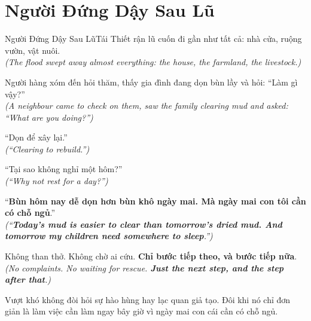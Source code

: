 \section{Người Đứng Dậy Sau Lũ}
\begin{truyen}{Người Đứng Dậy Sau Lũ}{Tái Thiết}
rận lũ cuốn đi gần như tất cả: nhà cửa, ruộng vườn, vật nuôi.\\
\textit{(The flood swept away almost everything: the house, the farmland, the livestock.)}

Người hàng xóm đến hỏi thăm, thấy gia đình đang dọn bùn lầy và hỏi: ``Làm gì vậy?''\\
\textit{(A neighbour came to check on them, saw the family clearing mud and asked: ``What are you doing?'')}

``Dọn để xây lại.''\\
\textit{(``Clearing to rebuild.'')}

``Tại sao không nghỉ một hôm?''\\
\textit{(``Why not rest for a day?'')}

``\textbf{Bùn hôm nay dễ dọn hơn bùn khô ngày mai. Mà ngày mai con tôi cần có chỗ ngủ}.''\\
\textit{(``\textbf{Today's mud is easier to clear than tomorrow's dried mud. And tomorrow my children need somewhere to sleep}.'')}

Không than thở. Không chờ ai cứu. \textbf{Chỉ bước tiếp theo, và bước tiếp nữa}.\\
\textit{(No complaints. No waiting for rescue. \textbf{Just the next step, and the step after that}.)}
\end{truyen}
\begin{baihoc}
  Vượt khó không đòi hỏi sự hào hùng hay lạc quan giả tạo. Đôi khi nó chỉ đơn giản là làm việc cần làm ngay bây giờ vì ngày mai con cái cần có chỗ ngủ.
\end{baihoc}

